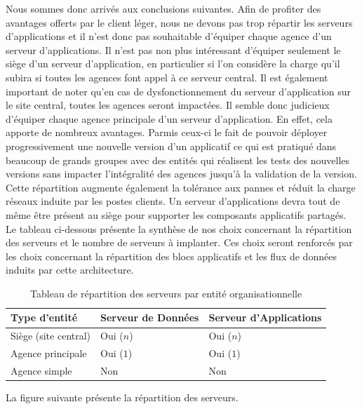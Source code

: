 Nous sommes donc arrivés aux conclusions suivantes. Afin de profiter des avantages offerts par le client léger, nous ne devons pas trop répartir les serveurs d'applications et il n'est donc pas souhaitable d'équiper chaque agence d'un serveur d'applications. Il n'est pas non plus intéressant d'équiper seulement le siège d'un serveur d'application, en particulier si l'on considère la charge qu'il subira si toutes les agences font appel à ce serveur central. Il est également important de noter qu'en cas de dysfonctionnement du serveur d'application sur le site central, toutes les agences seront impactées. Il semble donc judicieux d'équiper chaque agence principale d'un serveur d'application. En effet, cela apporte de nombreux avantages. Parmis ceux-ci le fait de pouvoir déployer progressivement une nouvelle version d'un applicatif ce qui est pratiqué dans beaucoup de grands groupes avec des entités qui réalisent les tests des nouvelles versions sans impacter l'intégralité des agences jusqu'à la validation de la version. Cette répartition augmente également la tolérance aux pannes et réduit la charge réseaux induite par les postes clients. Un serveur d'applications devra tout de même être présent au siège pour supporter les composants applicatifs partagés.\\

Le tableau ci-dessous présente la synthèse de nos choix concernant la répartition des serveurs et le nombre de serveurs à implanter. Ces choix seront renforcés par les choix concernant la répartition des blocs applicatifs et les flux de données induits par cette architecture. 


\begin{table}[H]
    \centering
    \begin{tabular}{l|l|l}
    Type d'entité        & Serveur de Données & Serveur d'Applications \\ \hline
    Siège (site central) & Oui ($n$)            & Oui ($n$)                \\
    Agence principale    & Oui ($1$)            & Oui ($1$)                \\
    Agence simple        & Non                & Non                    \\
    \end{tabular}
    \caption{Tableau de répartition des serveurs par entité organisationnelle}
\end{table}

La figure suivante présente la répartition des serveurs.

